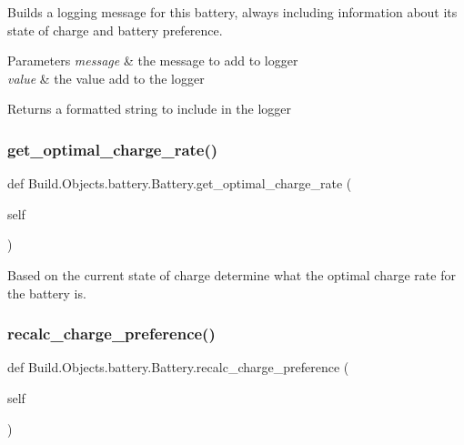 Builds a logging message for this battery, always including information about its state of charge and battery preference. 


\begin{DoxyParams}{Parameters}
{\em message} & the message to add to logger \\
\hline
{\em value} & the value add to the logger \\
\hline
\end{DoxyParams}
\begin{DoxyReturn}{Returns}
a formatted string to include in the logger 
\end{DoxyReturn}
\mbox{\label{class_build_1_1_objects_1_1battery_1_1_battery_a8f464a9edbd9a2efbe609477d004ccb1}} 
\subsubsection{\texorpdfstring{get\+\_\+optimal\+\_\+charge\+\_\+rate()}{get\_optimal\_charge\_rate()}}
{\footnotesize\ttfamily def Build.\+Objects.\+battery.\+Battery.\+get\+\_\+optimal\+\_\+charge\+\_\+rate (\begin{DoxyParamCaption}\item[{}]{self }\end{DoxyParamCaption})}



Based on the current state of charge determine what the optimal charge rate for the battery is. 

\mbox{\label{class_build_1_1_objects_1_1battery_1_1_battery_a2c343f81c849a4b8d6de5de9f19ebc98}} 
\subsubsection{\texorpdfstring{recalc\+\_\+charge\+\_\+preference()}{recalc\_charge\_preference()}}
{\footnotesize\ttfamily def Build.\+Objects.\+battery.\+Battery.\+recalc\+\_\+charge\+\_\+preference (\begin{DoxyParamCaption}\item[{}]{self }\end{DoxyParamCaption})}


